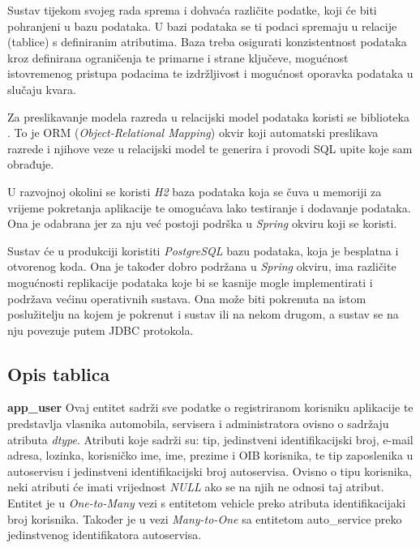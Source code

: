 %			

		Sustav tijekom svojeg rada sprema i dohvaća različite podatke, koji će biti pohranjeni u bazu podataka. U bazi podataka se ti podaci spremaju u relacije (tablice) s definiranim atributima. Baza treba osigurati konzistentnost podataka kroz definirana ograničenja te primarne i strane ključeve, mogućnost istovremenog pristupa podacima te izdržljivost i mogućnost oporavka podataka u slučaju kvara.
		
		Za preslikavanje modela razreda u relacijski model podataka koristi se biblioteka . To je ORM (\textit{Object-Relational Mapping}) okvir koji automatski preslikava razrede i njihove veze u relacijski model te generira i provodi SQL upite koje sam obrađuje.
		
		U razvojnoj okolini se koristi \textit{H2} baza podataka koja se čuva u memoriji za vrijeme pokretanja aplikacije te omogućava lako testiranje i dodavanje podataka. Ona je odabrana jer za nju već postoji podrška u \textit{Spring} okviru koji se koristi.
		
		Sustav će u produkciji koristiti \textit{PostgreSQL} bazu podataka, koja je besplatna i otvorenog koda. Ona je također dobro podržana u \textit{Spring} okviru, ima različite mogućnosti replikacije podataka koje bi se kasnije mogle implementirati i podržava većinu operativnih sustava. Ona može biti pokrenuta na istom poslužitelju na kojem je pokrenut i sustav ili na nekom drugom, a sustav se na nju povezuje putem JDBC protokola.
		
		
		
			\subsection{Opis tablica}
			

				
				\textbf{app\_user} Ovaj entitet sadrži sve podatke o registriranom korisniku aplikacije te predstavlja vlasnika automobila, servisera i administratora ovisno o sadržaju atributa \textit{dtype}. Atributi koje sadrži su: tip, jedinstveni identifikacijski broj, e-mail adresa, lozinka, korisničko ime, ime, prezime i OIB korisnika, te tip zaposlenika u autoservisu i jedinstveni identifikacijski broj autoservisa. Ovisno o tipu korisnika, neki atributi će imati vrijednost \textit{NULL} ako se na njih ne odnosi taj atribut. Entitet je u \textit{One-to-Many} vezi s entitetom vehicle preko atributa identifikacijaki broj korisnika. Također je u vezi \textit{Many-to-One} sa entitetom auto\_service preko jedinstvenog identifikatora autoservisa.
				

